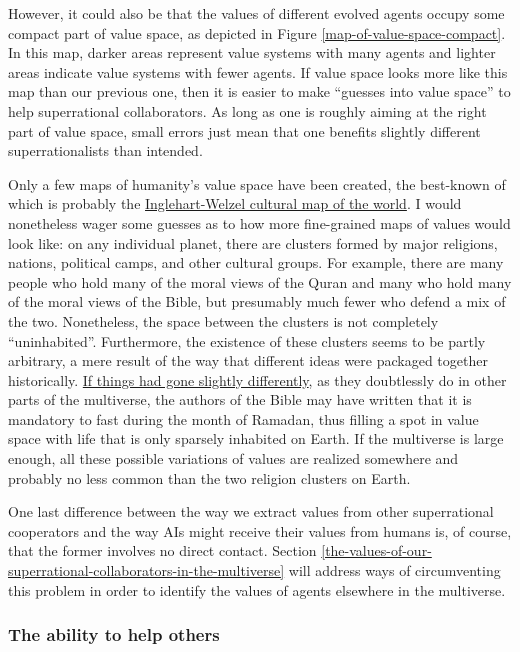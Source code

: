 However, it could also
be that the values of different evolved agents occupy some compact part
of value space, as depicted in Figure
\ref{map-of-value-space-compact}. In this map, darker areas represent value systems with many agents and
lighter areas indicate value systems with fewer agents. If value space
looks more like this map than our previous one, then it is easier to
make ``guesses into value space'' to help superrational collaborators.
As long as one is roughly aiming at the right part of value space, small
errors just mean that one benefits slightly different superrationalists
than intended.

Only a few maps of humanity's value space have been created, the
best-known of which is probably the
\href{https://en.wikipedia.org/wiki/Inglehart\%E2\%80\%93Welzel_cultural_map_of_the_world}{Inglehart-Welzel
cultural map of the world}. I would nonetheless wager some guesses as
to how more fine-grained maps of values would look like: on any
individual planet, there are clusters formed by major religions,
nations, political camps, and other cultural groups. For example, there
are many people who hold many of the moral views of the Quran and many
who hold many of the moral views of the Bible, but presumably much fewer
who defend a mix of the two. Nonetheless, the space between the clusters
is not completely ``uninhabited''. Furthermore, the existence of these
clusters seems to be partly arbitrary, a mere result of the way that
different ideas were packaged together historically.
\href{https://en.wikipedia.org/wiki/Path_dependence}{If things had
gone slightly differently}, as they doubtlessly do in other parts of
the multiverse, the authors of the Bible may have written that it is
mandatory to fast during the month of Ramadan, thus filling a spot in
value space with life that is only sparsely inhabited on Earth. If the
multiverse is large enough, all these possible variations of values are
realized somewhere and probably no less common than the two religion
clusters on Earth.

One last difference between the way we extract values from other
superrational cooperators and the way AIs might receive their values
from humans is, of course, that the former involves no direct contact.
Section \ref{the-values-of-our-superrational-collaborators-in-the-multiverse} will address ways of
circumventing this problem in order to identify the values of agents elsewhere in the multiverse.

\subsubsection{The ability to help
others}\label{the-ability-to-help-others}

